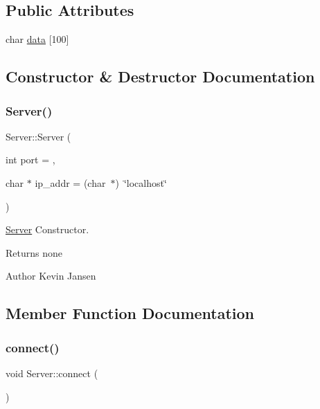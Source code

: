 \subsection*{Public Attributes}
\begin{DoxyCompactItemize}
\item 
char \hyperlink{classServer_a511bae2c5604c196eb714c798fdf709d}{data} \mbox{[}100\mbox{]}
\end{DoxyCompactItemize}


\subsection{Constructor \& Destructor Documentation}
\mbox{\label{classServer_a693b9b86cd9538ff4833a550515cabf8}} 
\subsubsection{\texorpdfstring{Server()}{Server()}}
{\footnotesize\ttfamily Server\+::\+Server (\begin{DoxyParamCaption}\item[{int}]{port = {},  }\item[{char $\ast$}]{ip\+\_\+addr = {\ttfamily (char~$\ast$)~\char`\"{}localhost\char`\"{}} }\end{DoxyParamCaption})}



\hyperlink{classServer}{Server} Constructor. 

\begin{DoxyReturn}{Returns}
none 
\end{DoxyReturn}
\begin{DoxyAuthor}{Author}
Kevin Jansen 
\end{DoxyAuthor}


\subsection{Member Function Documentation}
\mbox{\label{classServer_a0bd7069e79b4d5268f0947079e1af54a}} 
\subsubsection{\texorpdfstring{connect()}{connect()}}
{\footnotesize\ttfamily void Server\+::connect (\begin{DoxyParamCaption}{ }\end{DoxyParamCaption})}



